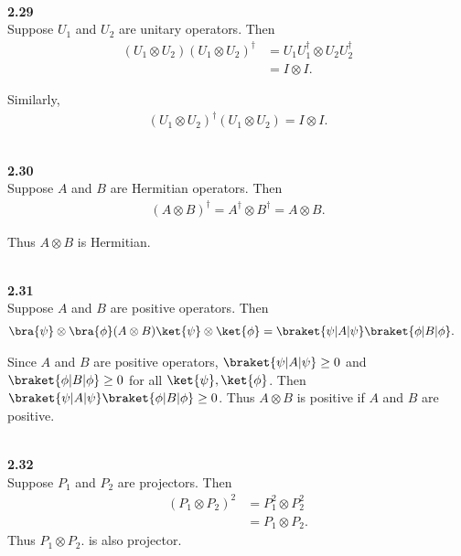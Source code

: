 \documentclass[10pt]{book}
\newcommand{\Textbf}[1]{\hspace{3mm}\\ \textbf{#1}\\}
\begin{document}
	\Textbf{2.29}
	Suppose $U_1$ and $U_2$ are unitary operators. Then
	\begin{equation}
\begin{aligned}
		(U_1 \otimes U_2) (U_1 \otimes U_2)^\dagger &=U_1 U_1^\dagger \otimes U_2 U_2^\dagger\\
		&= I \otimes I.
	\end{aligned}
\end{equation}
	
	Similarly,
	\begin{equation}
\begin{aligned}
		(U_1 \otimes U_2)^\dagger (U_1 \otimes U_2)  = I \otimes I.
	\end{aligned}
\end{equation}
	
	\Textbf{2.30}
	Suppose $A$ and $B$ are Hermitian operators. Then
	\begin{equation}
		\begin{aligned}
			(A \otimes B)^\dagger = A^\dagger \otimes B^\dagger = A \otimes B.
		\end{aligned}
	\end{equation}
	
	Thus $A \otimes B$ is Hermitian.
	
	
	
	\Textbf{2.31}
	
	Suppose $A$ and $B$ are positive operators. Then
	\begin{equation}
\begin{aligned}
		\bra{\psi} \otimes \bra{\phi} (A \otimes B) \ket{\psi} \otimes \ket{\phi} &= \braket{\psi |A| \psi} \braket{\phi | B | \phi}.
	\end{aligned}
\end{equation}
	
	Since $A$ and $B$ are positive operators,
	$\braket{\psi |A| \psi} \geq 0$ and $\braket{\phi | B | \phi} \geq 0$ for all $\ket{\psi}, \ket{\phi} $.
	Then $\braket{\psi |A| \psi} \braket{\phi | B | \phi} \geq 0$.
	Thus $A \otimes B$ is positive if $A$ and $B$ are positive.
	
	
	\Textbf{2.32}
	
	Suppose $P_1$ and $P_2$  are projectors. Then
	\begin{equation}
\begin{aligned}
		(P_1 \otimes P_2) ^2 &= P_1^2 \otimes P_2^2\\
		&= P_1 \otimes P_2.
	\end{aligned}
\end{equation}
	Thus $ P_1 \otimes P_2.$ is also projector.
	
\end{document}
